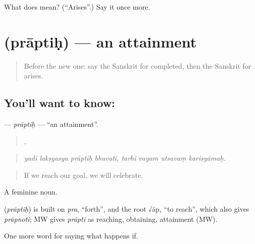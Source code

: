 \begin{tcolorbox}[breakable,colback=teal!4,colframe=teal!35!black,title={Before you move on}]
What does  mean? (\textquotedblleft{}Arises\textquotedblright{}.) Say it once more.
\end{tcolorbox}
\section[\texorpdfstring{\sk{प्राप्तिः} (prāptiḥ)}{प्राप्तिः (prāptiḥ)}]{ (prāptiḥ) — an attainment}

\label{lesson:SA-C546-praptih}



\begin{quote}
Before the new one: say the Sanskrit for completed, then the Sanskrit for arises.
\end{quote}

\subsection*{You'll want to know: }
\textbf{} — \emph{prāptiḥ} — \textquotedblleft{}an attainment\textquotedblright{}.

\begin{quote}
   ,    
\end{quote}

\begin{quote}
\emph{yadi lakṣyasya prāptiḥ bhavati, tarhi vayam utsavaṃ kariṣyāmaḥ.}
\end{quote}

\begin{quote}
If we reach our goal, we will celebrate.
\end{quote}

A feminine noun.

\begin{cousinweb}
\textbf{} (\emph{prāptiḥ}) is built on \emph{pra}, \textquotedblleft{}forth\textquotedblright{}, and the root √āp, \textquotedblleft{}to reach\textquotedblright{}, which also gives \emph{prāpnoti}; MW gives \emph{prāpti} as reaching, obtaining, attainment (MW).
\end{cousinweb}

\begin{grammarlens}[title={What you've built}]
One more word for saying what happens if.
\end{grammarlens}

